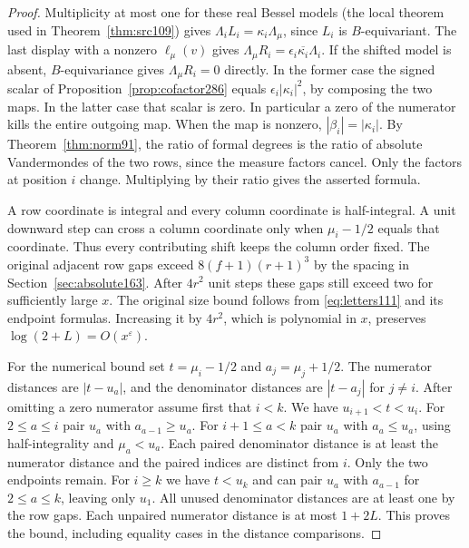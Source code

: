 \documentclass[a4paper,11pt]{article}
\theoremstyle{definition}
\theoremstyle{remark}
\numberwithin{equation}{section}
\begin{document}
\begin{proof}
Multiplicity at most one for these real Bessel models
(the local theorem used in Theorem~\ref{thm:src109}) gives
\(\Lambda_i L_i=\kappa_i\Lambda_\mu\), since \(L_i\) is
\(B\)-equivariant. The last display with a nonzero
\(\ell_\mu(v)\) gives
\(\Lambda_\mu R_i=\epsilon_i\overline{\kappa_i}\Lambda_i\).
If the shifted model is absent, \(B\)-equivariance gives
\(\Lambda_\mu R_i=0\) directly. In the former case the signed
scalar of Proposition~\ref{prop:cofactor286} equals
\(\epsilon_i|\kappa_i|^2\), by composing the two maps. In
the latter case that scalar is zero. In particular a zero
of the numerator kills the entire outgoing map. When the map
is nonzero, \(|\beta_i|=|\kappa_i|\).
By Theorem~\ref{thm:norm91}, the ratio of formal degrees is
the ratio of absolute Vandermondes of the two rows, since
the measure factors cancel. Only the factors at position \(i\)
change. Multiplying by their ratio gives the asserted formula.

A row coordinate is integral and every column coordinate is
half-integral. A unit downward step can cross a column
coordinate only when \(\mu_i-1/2\) equals that coordinate.
Thus every contributing shift keeps the column order fixed.
The original adjacent row gaps exceed
\(8(f+1)(r+1)^3\) by the spacing in Section~\ref{sec:absolute163}.
After \(4r^2\) unit steps these gaps still exceed two
for sufficiently large \(x\). The original size bound follows
from \eqref{eq:letters111} and its endpoint formulas.
Increasing it by \(4r^2\), which is polynomial in \(x\), preserves
\(\log(2+L)=O(x^\varepsilon)\).

For the numerical bound set \(t=\mu_i-1/2\) and
\(a_j=\mu_j+1/2\). The numerator distances are \(|t-u_a|\),
and the denominator distances are \(|t-a_j|\) for \(j\ne i\).
After omitting a zero numerator assume first that \(i<k\).
We have \(u_{i+1}<t<u_i\). For \(2\le a\le i\) pair \(u_a\)
with \(a_{a-1}\ge u_a\). For \(i+1\le a<k\) pair \(u_a\)
with \(a_a\le u_a\), using half-integrality and
\(\mu_a<u_a\). Each paired denominator distance is at least
the numerator distance and the paired indices are distinct
from \(i\). Only the two endpoints remain. For \(i\ge k\)
we have \(t<u_k\) and can pair \(u_a\) with \(a_{a-1}\) for
\(2\le a\le k\), leaving only \(u_1\).
All unused denominator distances are at least one by the row
gaps. Each unpaired numerator distance is at most \(1+2L\).
This proves the bound, including equality cases in the
distance comparisons.
\end{proof}
\end{document}
